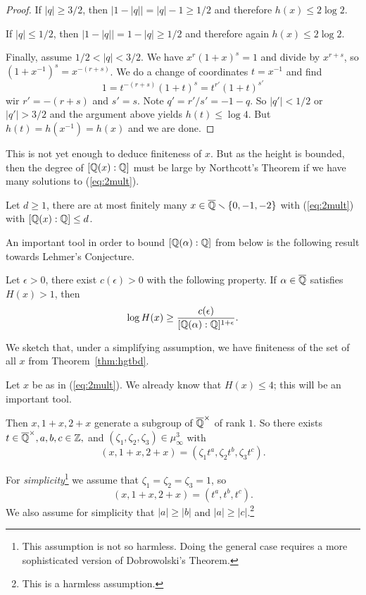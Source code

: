 \begin{proof}
  If $|q| \ge 3/2$, then $|1-|q|| = |q|-1\ge 1/2$ and therefore $h(x)\le
  2\log 2$.

  If $|q|\le 1/2$, then $|1-|q|| = 1-|q|\ge 1/2$ and therefore again
  $h(x)\le 2\log 2$.

  Finally, assume $1/2 < |q| < 3/2$. We have $x^r(1+x)^s=1$ and divide
  by $x^{r+s}$, so $(1+x^{-1})^s = x^{-(r+s)}$. We do a change of
  coordinates $t=x^{-1}$ and
  find $$1=t^{-(r+s)}(1+t)^s=t^{r'}(1+t)^{s'}$$
  wir $r'=-(r+s)$ and $s'=s$. Note $q'= r'/s'=-1-q$.
  So $|q'|< 1/2$ or $|q'|>3/2$ and the argument above yields $h(t)\le
  \log 4$.
  But $h(t)=h(x^{-1})=h(x)$ and we are done. 
\end{proof}

This is not yet enough to deduce finiteness of $x$.
But as the height is bounded, then the degree of
$[{\mathbb{Q}}(x):{\mathbb{Q}}]$ must be large by Northcott's Theorem if we have many
solutions to (\ref{eq:2mult}).

\begin{corollary}
  Let $d\ge 1$, there are at most finitely many
  $x\in{\overline{\mathbb{Q}}}\smallsetminus\{0,-1,-2\}$ with (\ref{eq:2mult}) with
  $[{\mathbb{Q}}(x):{\mathbb{Q}}]\le d$. 
\end{corollary}

An important tool in order to bound $[{\mathbb{Q}}(\alpha):{\mathbb{Q}}]$ from below is
the following result towards Lehmer's Conjecture.

\begin{theorem}[Dobrowolski]
  Let $\epsilon > 0$, there exist $c(\epsilon)>0$ with the following
  property.
  If $\alpha\in{\overline{\mathbb{Q}}}$ satisfies $H(x) > 1$, then
  \begin{equation*}
    \log H(x) \ge \frac{c(\epsilon)}{[{\mathbb{Q}}(\alpha):{\mathbb{Q}}]^{1+\epsilon}}. 
  \end{equation*}
\end{theorem}



We sketch that, under a simplifying assumption, we have finiteness of the set of
all $x$ from Theorem~\ref{thm:hgtbd}. 

Let $x$ be as in (\ref{eq:2mult}). We already know that $H(x)\le 4$;
this will be an important tool. 

Then $x,1+x,2+x$ generate a
subgroup of ${\overline{\mathbb{Q}}}^\times$ of rank $1$. So there exists $t\in
{\overline{\mathbb{Q}}}^\times, a,b,c\in{\mathbb{Z}},$ and
$(\zeta_1,\zeta_2,\zeta_3)\in\mu_\infty^3$  with 
$$
(x,1+x,2+x) = (\zeta_1 t^a, \zeta_2 t^b,\zeta_3 t^c).
$$

For \emph{simplicity}\footnote{This assumption is not so harmless.
  Doing the general case requires a more sophisticated version of
  Dobrowolski's Theorem.} we assume that
$\zeta_1=\zeta_2=\zeta_3=1$, so
$$
(x,1+x,2+x) = (t^a, t^b,t^c).
$$
We also assume for simplicity that $|a|\ge |b|$ and $|a|\ge
|c|$.\footnote{This is a harmless assumption.}

